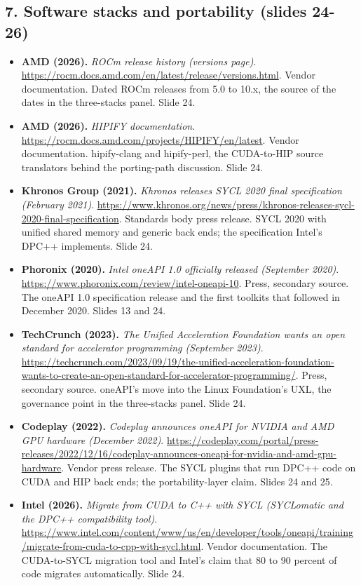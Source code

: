 \subsection*{7. Software stacks and portability (slides 24-26)}
\begin{itemize}[leftmargin=1.2em,itemsep=3pt]\sloppy
\item \textbf{AMD (2026).} \textit{ROCm release history (versions page)}. \url{https://rocm.docs.amd.com/en/latest/release/versions.html}. Vendor documentation. Dated ROCm releases from 5.0 to 10.x, the source of the dates in the three-stacks panel. Slide 24.
\item \textbf{AMD (2026).} \textit{HIPIFY documentation}. \url{https://rocm.docs.amd.com/projects/HIPIFY/en/latest}. Vendor documentation. hipify-clang and hipify-perl, the CUDA-to-HIP source translators behind the porting-path discussion. Slide 24.
\item \textbf{Khronos Group (2021).} \textit{Khronos releases SYCL 2020 final specification (February 2021)}. \url{https://www.khronos.org/news/press/khronos-releases-sycl-2020-final-specification}. Standards body press release. SYCL 2020 with unified shared memory and generic back ends; the specification Intel's DPC++ implements. Slide 24.
\item \textbf{Phoronix (2020).} \textit{Intel oneAPI 1.0 officially released (September 2020)}. \url{https://www.phoronix.com/review/intel-oneapi-10}. Press, secondary source. The oneAPI 1.0 specification release and the first toolkits that followed in December 2020. Slides 13 and 24.
\item \textbf{TechCrunch (2023).} \textit{The Unified Acceleration Foundation wants an open standard for accelerator programming (September 2023)}. \url{https://techcrunch.com/2023/09/19/the-unified-acceleration-foundation-wants-to-create-an-open-standard-for-accelerator-programming/}. Press, secondary source. oneAPI's move into the Linux Foundation's UXL, the governance point in the three-stacks panel. Slide 24.
\item \textbf{Codeplay (2022).} \textit{Codeplay announces oneAPI for NVIDIA and AMD GPU hardware (December 2022)}. \url{https://codeplay.com/portal/press-releases/2022/12/16/codeplay-announces-oneapi-for-nvidia-and-amd-gpu-hardware}. Vendor press release. The SYCL plugins that run DPC++ code on CUDA and HIP back ends; the portability-layer claim. Slides 24 and 25.
\item \textbf{Intel (2026).} \textit{Migrate from CUDA to C++ with SYCL (SYCLomatic and the DPC++ compatibility tool)}. \url{https://www.intel.com/content/www/us/en/developer/tools/oneapi/training/migrate-from-cuda-to-cpp-with-sycl.html}. Vendor documentation. The CUDA-to-SYCL migration tool and Intel's claim that 80 to 90 percent of code migrates automatically. Slide 24.

\end{itemize}
